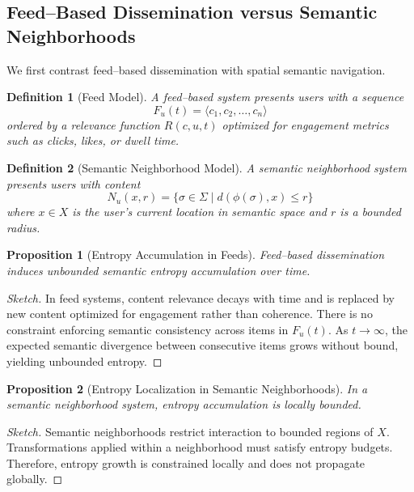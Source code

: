 \documentclass[11pt]{article}
\newtheorem{definition}{Definition}
\newtheorem{proposition}{Proposition}
\begin{document}
\subsection{Feed--Based Dissemination versus Semantic Neighborhoods}

We first contrast feed--based dissemination with spatial semantic navigation.

\begin{definition}[Feed Model]
A feed--based system presents users with a sequence
\[
F_u(t) = \langle c_1, c_2, \dots, c_n \rangle
\]
ordered by a relevance function $R(c, u, t)$ optimized for engagement metrics such as
clicks, likes, or dwell time.
\end{definition}

\begin{definition}[Semantic Neighborhood Model]
A semantic neighborhood system presents users with content
\[
N_u(x, r) = \{ \sigma \in \Sigma \mid d(\phi(\sigma), x) \le r \}
\]
where $x \in X$ is the user’s current location in semantic space and $r$ is a bounded
radius.
\end{definition}

\begin{proposition}[Entropy Accumulation in Feeds]
Feed--based dissemination induces unbounded semantic entropy accumulation over time.
\end{proposition}

\begin{proof}[Sketch]
In feed systems, content relevance decays with time and is replaced by new content
optimized for engagement rather than coherence. There is no constraint enforcing semantic
consistency across items in $F_u(t)$. As $t \to \infty$, the expected semantic divergence
between consecutive items grows without bound, yielding unbounded entropy.
\end{proof}

\begin{proposition}[Entropy Localization in Semantic Neighborhoods]
In a semantic neighborhood system, entropy accumulation is locally bounded.
\end{proposition}

\begin{proof}[Sketch]
Semantic neighborhoods restrict interaction to bounded regions of $X$. Transformations
applied within a neighborhood must satisfy entropy budgets. Therefore, entropy growth is
constrained locally and does not propagate globally.
\end{proof}
\end{document}
